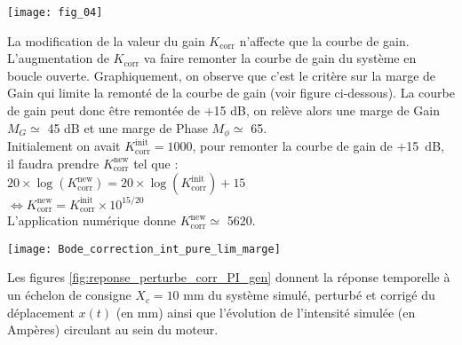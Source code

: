 

\begin{marginfigure}
\texttt{[image: fig\_04]}
\end{marginfigure}

\ifprof
\begin{corrige}
La modification de la valeur du gain $K_{\text{corr}}$ n'affecte que la courbe de gain. L'augmentation de $K_{\text{corr}}$ va faire remonter la courbe de gain du système en boucle ouverte. Graphiquement, on observe que c'est le critère sur la marge de Gain qui limite la remonté de la courbe de gain (voir figure ci-dessous). La courbe de gain peut donc être remontée de +15 dB, on relève alors une marge de Gain $M_G \simeq$ 45 dB et une marge de Phase $M_{\phi} \simeq$ 65\degre. \\
Initialement on avait $K_{\text{corr}}^{\text{init}} = 1000$, pour remonter la courbe de gain de +\SI{15}{dB}, il faudra prendre $K_{\text{corr}}^{\text{new}}$ tel que : \\
$20 \times \log(K_{\text{corr}}^{\text{new}}) = 20 \times \log(K_{\text{corr}}^{\text{init}}) + 15$\\
$\Leftrightarrow K_{\text{corr}}^{\text{new}} = K_{\text{corr}}^{\text{init}} \times 10^{15/20}$\\
L'application numérique donne $K_{\text{corr}}^{\text{new}} \simeq$ 5620. 
 
 
\begin{center}
       \texttt{[image: Bode\_correction\_int\_pure\_lim\_marge]}

 \end{center} 

\end{corrige}
\fi

\ifprof
\else
\vspace{1em}
Les figures \ref{fig:reponse_perturbe_corr_PI_gen} donnent la réponse temporelle à un échelon de consigne $X_c = 10$ mm du système simulé, perturbé et corrigé du déplacement $x(t)$ (en mm)  ainsi que l'évolution de l'intensité simulée (en Ampères) circulant au sein du moteur.

